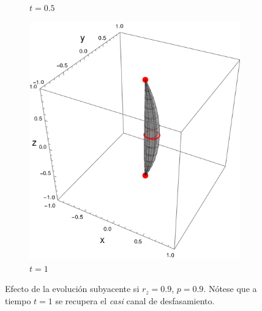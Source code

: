 \begin{figure}[ht!]
\begin{subfigure}{0.32\textwidth}
      \caption{$t=0.5$}
    \end{subfigure}
    \begin{subfigure}{0.32\textwidth}
      \centering
      \includegraphics[width=0.9\linewidth]{chapter3/figures_toy/sphere_CNOT_t=1._r=0.9_p=0.9.png}
      \caption{$t=1$}
    \end{subfigure}
    \caption{Efecto de la evolución subyacente si $r_{z}=0.9$, $p=0.9$. Nótese que a tiempo $t=1$ se recupera el \textit{casi} canal de desfasamiento.}
    \label{fig:AlmostPhaseFlipSequence}
    \end{figure}

